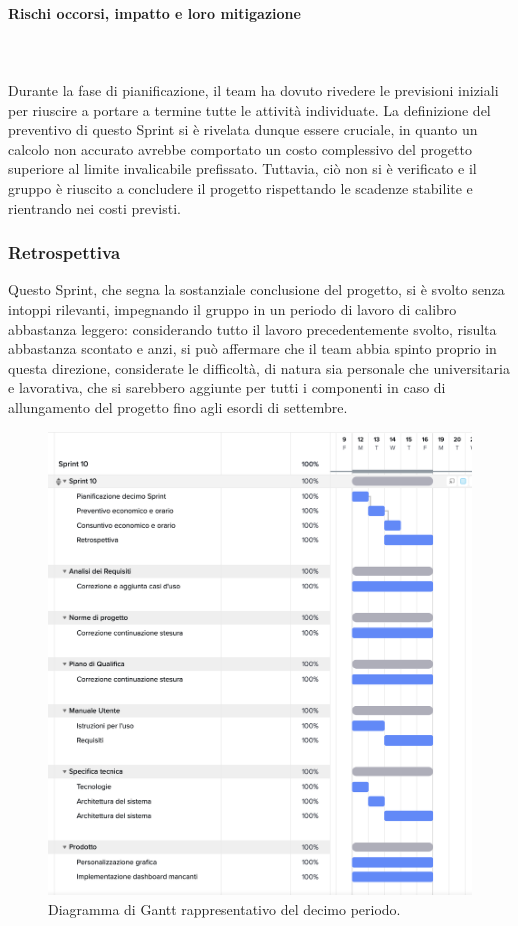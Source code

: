 \documentclass[8pt]{article}
\newcommand{\subsubsubsection}[1]{\paragraph{#1}\mbox{}\\}
\begin{document}
\subsubsubsection{Rischi occorsi, impatto e loro mitigazione} \\
Durante la fase di pianificazione, il team ha dovuto rivedere le previsioni iniziali per riuscire a portare a termine tutte le attività individuate. La definizione del preventivo di questo Sprint si è rivelata dunque essere cruciale, in quanto un calcolo non accurato avrebbe comportato un costo complessivo del progetto superiore al limite invalicabile prefissato. Tuttavia, ciò non si è verificato e il gruppo è riuscito a concludere il progetto rispettando le scadenze stabilite e rientrando nei costi previsti. 
\subsubsection{Retrospettiva}
Questo Sprint, che segna la sostanziale conclusione del progetto, si è svolto senza intoppi rilevanti, impegnando il gruppo in un periodo di lavoro di calibro abbastanza leggero: considerando tutto il lavoro precedentemente svolto, risulta abbastanza scontato e anzi, si può affermare che il team abbia spinto proprio in questa direzione, considerate le difficoltà, di natura sia personale che universitaria e lavorativa, che si sarebbero aggiunte  per tutti i componenti in caso di allungamento del progetto fino agli esordi di settembre.   
\begin{figure}[h!]
    \centering
    \includegraphics[width=13cm]{./images_pdp/gantt10.png}
    \caption{Diagramma di Gantt rappresentativo del decimo periodo.}
\end{figure}
\clearpage
\newpage
\end{document}

